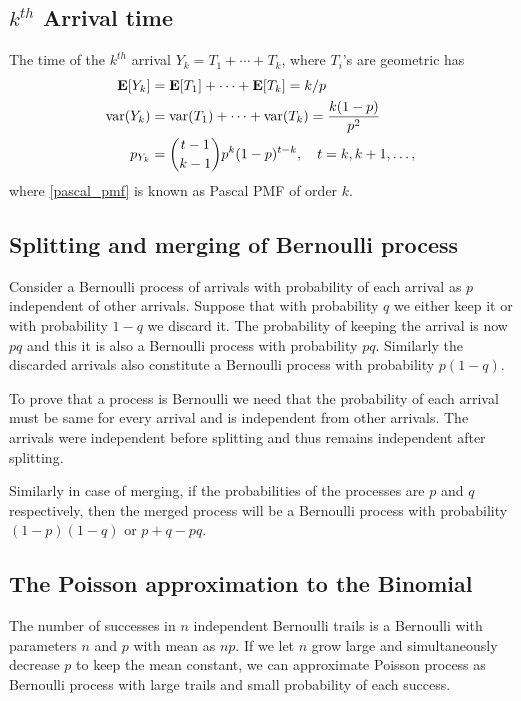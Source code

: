 \subsection{$k^{th}$ Arrival time}

The time of the $k^{th}$ arrival $Y_k=T_1+\cdots+T_k$, where $T_i$'s are geometric \rv has
\begin{align}
    \operatorname{\textbf{E}}[Y_k]&=\operatorname{\textbf{E}}[T_1]+\cdots+\operatorname{\textbf{E}}[T_k]=k/p\\
    \operatorname{\text{var}}(Y_k)&=\operatorname{\text{var}}(T_1)+\cdots+\operatorname{\text{var}}(T_k)=\frac{k(1-p)}{p^2}\\
    \label{pascal_pmf}
    p_{Y_k}&=\binom{t-1}{k-1}p^k(1-p)^{t-k}, \quad t=k,k+1,\ldots,
\end{align}
where \ref{pascal_pmf} is known as Pascal PMF of order $k$.

\subsection{Splitting and merging of Bernoulli process}
Consider a Bernoulli process of arrivals with probability of each arrival as $p$ independent of other arrivals. Suppose that with probability $q$ we either keep it or with probability $1-q$ we discard it. The probability of keeping the arrival is now $pq$ and this it is also a Bernoulli process with probability $pq$. Similarly the discarded arrivals also constitute a Bernoulli process with probability $p(1-q)$.

\begin{remark}
    To prove that a process is Bernoulli we need that the probability of each arrival must be same for every arrival and is independent from other arrivals. The arrivals were independent before splitting and thus remains independent after splitting.
\end{remark}

Similarly in case of merging, if the probabilities of the processes are $p$ and $q$ respectively, then the merged process will be a Bernoulli process with probability $(1-p)(1-q)$ or $p+q-pq$.

\subsection{The Poisson approximation to the Binomial}
The number of successes in $n$ independent Bernoulli trails is a Bernoulli \rv with parameters $n$ and $p$ with mean as $np$. If we let $n$ grow large and simultaneously decrease $p$ to keep the mean constant, we can approximate Poisson process as Bernoulli process with large trails and small probability of each success.

